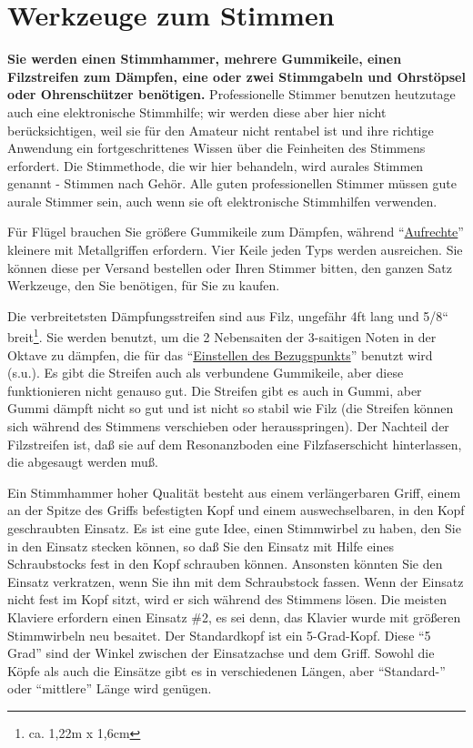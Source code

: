 
\chapter{Werkzeuge zum Stimmen}
\label{c2_3}

\textbf{Sie werden einen Stimmhammer, mehrere Gummikeile, einen Filzstreifen zum Dämpfen, eine oder zwei Stimmgabeln und Ohrstöpsel oder Ohrenschützer benötigen.}
Professionelle Stimmer benutzen heutzutage auch eine elektronische Stimmhilfe; wir werden diese aber hier nicht berücksichtigen, weil sie für den Amateur nicht rentabel ist und ihre richtige Anwendung ein fortgeschrittenes Wissen über die Feinheiten des Stimmens erfordert.
Die Stimmethode, die wir hier behandeln, wird aurales Stimmen genannt - Stimmen nach Gehör.
Alle guten professionellen Stimmer müssen gute aurale Stimmer sein, auch wenn sie oft elektronische Stimmhilfen verwenden.

Für Flügel brauchen Sie größere Gummikeile zum Dämpfen, während \enquote{\hyperref[upright]{Aufrechte}} kleinere mit Metallgriffen erfordern.
Vier Keile jeden Typs werden ausreichen.
Sie können diese per Versand bestellen oder Ihren Stimmer bitten, den ganzen Satz Werkzeuge, den Sie benötigen, für Sie zu kaufen.

Die verbreitetsten Dämpfungsstreifen sind aus Filz, ungefähr 4ft lang und 5/8`` breit\footnote{ca. 1,22m x 1,6cm}.
Sie werden benutzt, um die 2 Nebensaiten der 3-saitigen Noten in der Oktave zu dämpfen, die für das \enquote{\hyperref[c2_4]{Einstellen des Bezugspunkts}} benutzt wird (s.u.).
Es gibt die Streifen auch als verbundene Gummikeile, aber diese funktionieren nicht genauso gut.
Die Streifen gibt es auch in Gummi, aber Gummi dämpft nicht so gut und ist nicht so stabil wie Filz (die Streifen können sich während des Stimmens verschieben oder herausspringen).
Der Nachteil der Filzstreifen ist, daß sie auf dem Resonanzboden eine Filzfaserschicht hinterlassen, die abgesaugt werden muß.

Ein Stimmhammer hoher Qualität besteht aus einem verlängerbaren Griff, einem an der Spitze des Griffs befestigten Kopf und einem auswechselbaren, in den Kopf geschraubten Einsatz.
Es ist eine gute Idee, einen Stimmwirbel zu haben, den Sie in den Einsatz stecken können, so daß Sie den Einsatz mit Hilfe eines Schraubstocks fest in den Kopf schrauben können.
Ansonsten könnten Sie den Einsatz verkratzen, wenn Sie ihn mit dem Schraubstock fassen.
Wenn der Einsatz nicht fest im Kopf sitzt, wird er sich während des Stimmens lösen.
Die meisten Klaviere erfordern einen Einsatz \#2, es sei denn, das Klavier wurde mit größeren Stimmwirbeln neu besaitet.
Der Standardkopf ist ein 5-Grad-Kopf.
Diese \enquote{5 Grad} sind der Winkel zwischen der Einsatzachse und dem Griff.
Sowohl die Köpfe als auch die Einsätze gibt es in verschiedenen Längen, aber \enquote{Standard-} oder \enquote{mittlere} Länge wird genügen.
 

